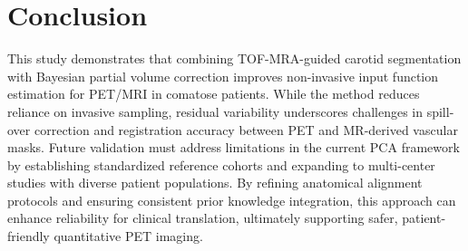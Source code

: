 \chapter{Conclusion}
This study demonstrates that combining TOF-MRA-guided carotid segmentation with Bayesian partial volume correction improves non-invasive input function estimation for PET/MRI in comatose patients.
While the method reduces reliance on invasive sampling, residual variability underscores challenges in spill-over correction and registration accuracy between PET and MR-derived vascular masks.
Future validation must address limitations in the current PCA framework by establishing standardized reference cohorts and expanding to multi-center studies with diverse patient populations.
By refining anatomical alignment protocols and ensuring consistent prior knowledge integration, this approach can enhance reliability for clinical translation, ultimately supporting safer, patient-friendly quantitative PET imaging.
